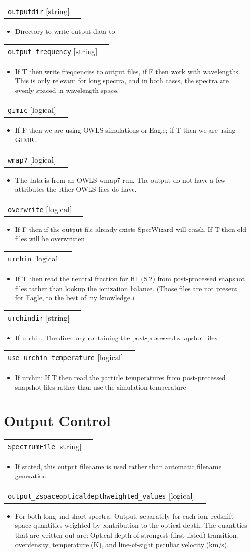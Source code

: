 \documentclass{report}
\makeatletter
\newcommand{\paramdefinition}[3]{
\begin{tabular*}{\textwidth}{l@{\extracolsep{\fill}}r}
		{\tt #1} [{\sc #2}]& #3 \\
\end{tabular*}}
\newcommand{\paramdescription}[1]{
\begin{itemize}
\item #1
\end{itemize}\vspace{0.2cm}}
\makeatother
\begin{document}
\paramdefinition{outputdir}{string}{}
\paramdescription{Directory to write output data to}

\paramdefinition{output\_frequency}{string}{}
\paramdescription{If T then write frequencies to output files, if F then work with wavelengths. This is only relevant for long spectra, and in both cases, the spectra are evenly spaced in wavelength space.}

\paramdefinition{gimic}{logical}{}
\paramdescription{If F then we are using OWLS simulations or Eagle; if T then we are using GIMIC}

\paramdefinition{wmap7}{logical}{}
\paramdescription{The data is from an OWLS wmap7 run. The output do not have a few attributes the other OWLS files do have.}

\paramdefinition{overwrite}{logical}{}
\paramdescription{If F then if the output file already exists SpecWizard will crash.  If T then old files will be overwritten}

\paramdefinition{urchin}{logical}{}
\paramdescription{If T then read the neutral fraction for H1 (Si2) from post-processed snapshot files rather than lookup the ionization balance. (Those files are not present for Eagle, to the best of my knowledge.)}

\paramdefinition{urchindir}{string}{}
\paramdescription{If urchin: The directory containing the post-processed snapshot files}

\paramdefinition{use\_urchin\_temperature}{logical}{}
\paramdescription{If urchin: If T then read the particle temperatures from post-processed snapshot files rather than use the simulation temperature}



\section{Output Control}

\paramdefinition{SpectrumFile}{string}{}
\paramdescription{If stated, this output filename is used rather than automatic filename generation.}

\paramdefinition{output\_zspaceopticaldepthweighted\_values}{logical}{ }
\paramdescription{For both long and short spectra. Output, separately for each ion, redshift space quantities weighted by contribution to the optical depth. The quantities that are written out are:  Optical depth of strongest (first listed) transition, overdensity, temperature (K), and line-of-sight peculiar velocity (km/s).}
\end{document}
